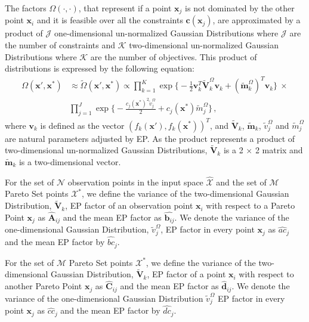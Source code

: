 The factors $\Omega(\cdot,\cdot)$, that represent if a point $\boldsymbol{x}_j$ is not dominated by the other point $\boldsymbol{x}_i$ and it is feasible over all the constraints $\boldsymbol{c}(\boldsymbol{x}_j)$, are approximated by a product of $\mathcal{J}$ one-dimensional un-normalized Gaussian Distributions where $\mathcal{J}$ are the number of constraints and $\mathcal{K}$ two-dimensional un-normalized Gaussian Distributions where $\mathcal{K}$ are the number of objectives. This product of distributions is expressed by the following equation:
\begin{align}
\Omega(\boldsymbol{x}',\boldsymbol{x}^*) & \approx \tilde{\Omega}(\boldsymbol{x}',\boldsymbol{x}^*) \propto \prod_{k=1}^{K}\exp\bigg\{-\frac{1}{2}\boldsymbol{v}_{k}^{T}\tilde{\boldsymbol{V}}_{k}^{\Omega}\boldsymbol{v}_k + (\tilde{\boldsymbol{m}}_{k}^{\Omega})^{T}\boldsymbol{v}_k\bigg\} \  \times \nonumber \\ & \prod_{j=1}^{J} \exp \bigg\{ - \frac{c_j(\boldsymbol{x}^*)^2\tilde{v}_j^{\Omega}}{2} + c_j(\boldsymbol{x}^*)\tilde{m}_j^{\Omega} \bigg\}\,,
\end{align}
where $\boldsymbol{v}_k$ is defined as the vector $(f_k(\boldsymbol{x}'),f_k(\boldsymbol{x}^*))^T$, and $\tilde{\boldsymbol{V}}_{k}$, $\tilde{\boldsymbol{m}}_{k}$, $\tilde{v}_j^{\Omega}$ and $\tilde{m}_j^{\Omega}$ are natural parameters adjusted by EP. As the product represents a product of two-dimensional un-normalized Gaussian Distributions, $\tilde{\boldsymbol{V}}_{k}$ is a 2 $\times$ 2 matrix and $\tilde{\boldsymbol{m}}_{k}$ is a two-dimensional vector.

For the set of $\mathcal{N}$ observation points in the input space $\hat{\mathcal{X}}$ and the set of $\mathcal{M}$ Pareto Set points $\mathcal{X}^*$, we define the variance of the two-dimensional Gaussian Distribution, $\tilde{\boldsymbol{V}}_{k}$, EP factor of an observation point $\boldsymbol{x}_i$ with respect to a Pareto Point $\boldsymbol{x}_j$ as $\hat{\boldsymbol{A}}_{ij}$ and the mean EP factor as $\hat{\boldsymbol{b}_{ij}}$. We denote the variance of the one-dimensional Gaussian Distribution, $\tilde{v}_j^{\Omega}$, EP factor in every point $\boldsymbol{x}_j$ as $\hat{ac}_j$ and the mean EP factor by $\hat{bc}_j$.

For the set of $\mathcal{M}$ Pareto Set points $\mathcal{X}^*$, we define the variance of the two-dimensional Gaussian Distribution, $\tilde{\boldsymbol{V}}_{k}$, EP factor of a point $\boldsymbol{x}_i$ with respect to another Pareto Point $\boldsymbol{x}_j$ as $\hat{\boldsymbol{C}}_{ij}$ and the mean EP factor as $\hat{\boldsymbol{d}}_{ij}$. We denote the variance of the one-dimensional Gaussian Distribution $\tilde{v}_j^{\Omega}$ EP factor in every point $\boldsymbol{x}_j$ as $\hat{cc}_j$ and the mean EP factor by $\hat{dc}_j$.

